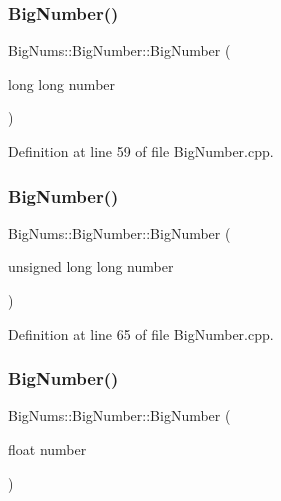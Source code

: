 \subsubsection{\texorpdfstring{BigNumber()}{BigNumber()}\hspace{0.1cm}{\footnotesize\ttfamily [10/16]}}
{\footnotesize\ttfamily Big\+Nums\+::\+Big\+Number\+::\+Big\+Number (\begin{DoxyParamCaption}\item[{long long}]{number }\end{DoxyParamCaption})\hspace{0.3cm}{\ttfamily [explicit]}}



Definition at line 59 of file Big\+Number.\+cpp.

\mbox{\label{class_big_nums_1_1_big_number_aff681535ca202ff247413e35e09388ad}} 
\subsubsection{\texorpdfstring{BigNumber()}{BigNumber()}\hspace{0.1cm}{\footnotesize\ttfamily [11/16]}}
{\footnotesize\ttfamily Big\+Nums\+::\+Big\+Number\+::\+Big\+Number (\begin{DoxyParamCaption}\item[{unsigned long long}]{number }\end{DoxyParamCaption})\hspace{0.3cm}{\ttfamily [explicit]}}



Definition at line 65 of file Big\+Number.\+cpp.

\mbox{\label{class_big_nums_1_1_big_number_afa8357b2be149b6f21f404e8cb95ebf2}} 
\subsubsection{\texorpdfstring{BigNumber()}{BigNumber()}\hspace{0.1cm}{\footnotesize\ttfamily [12/16]}}
{\footnotesize\ttfamily Big\+Nums\+::\+Big\+Number\+::\+Big\+Number (\begin{DoxyParamCaption}\item[{float}]{number }\end{DoxyParamCaption})\hspace{0.3cm}{\ttfamily [explicit]}}



